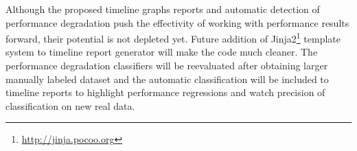 Although the proposed timeline graphs reports and automatic detection of
performance degradation push the effectivity of working with performance
results forward, their potential is not depleted yet. Future addition of
Jinja2\footnote{\url{http://jinja.pocoo.org}} template system to timeline report
generator will make the code much cleaner. The performance degradation classifiers will be
reevaluated after obtaining larger manually labeled dataset and the automatic
classification will be included to timeline reports to highlight performance
regressions and watch precision of classification on new real data.
